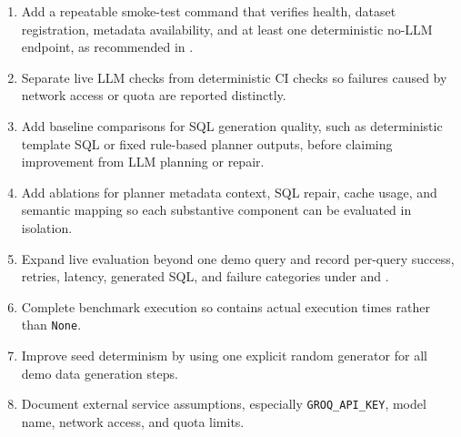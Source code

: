 \documentclass[12pt,a4paper]{article}
\begin{document}
\begin{enumerate}
  \item Add a repeatable smoke-test command that verifies health, dataset registration, metadata availability, and at least one deterministic no-LLM endpoint, as recommended in .
  \item Separate live LLM checks from deterministic CI checks so failures caused by network access or quota are reported distinctly.
  \item Add baseline comparisons for SQL generation quality, such as deterministic template SQL or fixed rule-based planner outputs, before claiming improvement from LLM planning or repair.
  \item Add ablations for planner metadata context, SQL repair, cache usage, and semantic mapping so each substantive component can be evaluated in isolation.
  \item Expand live evaluation beyond one demo query and record per-query success, retries, latency, generated SQL, and failure categories under  and .
  \item Complete benchmark execution so  contains actual execution times rather than \texttt{None}.
  \item Improve seed determinism by using one explicit random generator for all demo data generation steps.
  \item Document external service assumptions, especially \texttt{GROQ\_API\_KEY}, model name, network access, and quota limits.
\end{enumerate}
\end{document}
